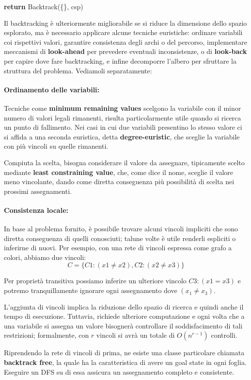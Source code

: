 \begin{algorithm}[h]
	\caption{Backtracking-Search(csp) returns solution or failure}
	\begin{algorithmic}[i]
		\State \textbf{return} Backtrack(\{\}, csp)
	\end{algorithmic}
\end{algorithm}

\noindent Il backtracking è ulteriormente migliorabile se si riduce la dimensione dello spazio esplorato, ma è necessario applicare alcune tecniche
euristiche: ordinare variabili coi rispettivi valori, garantire consistenza degli archi o del percorso, implementare meccanismi di \textbf{look-ahead}
per prevedere eventuali inconsistenze, o di \textbf{look-back} per capire dove fare backtracking, e infine decomporre l'albero per sfruttare la
struttura del problema. Vediamoli separatamente:

\paragraph{Ordinamento delle variabili:} Tecniche come \textbf{minimum remaining values} scelgono la variabile con il minor numero di valori legali
rimanenti, risulta particolarmente utile quando si ricerca un punto di fallimento. Nei casi in cui due variabili presentino lo stesso valore ci si
affida a una seconda euristica, detta \textbf{degree-euristic}, che sceglie la variabile con più vincoli su quelle rimanenti.\par
Compiuta la scelta, bisogna considerare il valore da assegnare, tipicamente scelto mediante \textbf{least constraining value}, che, come dice il nome,
sceglie il valore meno vincolante, dando come diretta conseguenza più possibilità di scelta nei prossimi assegnamenti.

\paragraph{Consistenza locale:} In base al problema fornito, è possibile trovare alcuni vincoli impliciti che sono diretta conseguenza di quelli
conosciuti; talune volte è utile renderli espliciti o inferirne di nuovi. Per esempio, con una rete di vincoli espressa come grafo a colori, abbiamo due
vincoli: \[
	C = \{C1:(x1\neq x2), C2:(x2\neq x3)\}
\]

\noindent Per proprietà transitiva possiamo inferire un ulteriore vincolo $C3 : (x1 = x3)$ e potremo tranquillamente ignorare ogni assegnamento dove
$(x_1 \neq x_3)$.\par
L'aggiunta di vincoli implica la riduzione dello spazio di ricerca e quindi anche il tempo di esecuzione. Tuttavia, richiede ulteriore computazione e
ogni volta che a una variabile si assegna un valore bisognerà controllare il soddisfacimento di tali restrizioni; formalmente, con $r$ vincoli si avrà
un totale di $O(n^{r-1})$ controlli.\par
Riprendendo la rete di vincoli di prima, ne esiste una classe particolare chiamata \textbf{backtrack free}, la quale ha la caratteristica di avere un
goal state in ogni foglia. Eseguire un DFS su di essa assicura un assegnamento completo e consistente.

